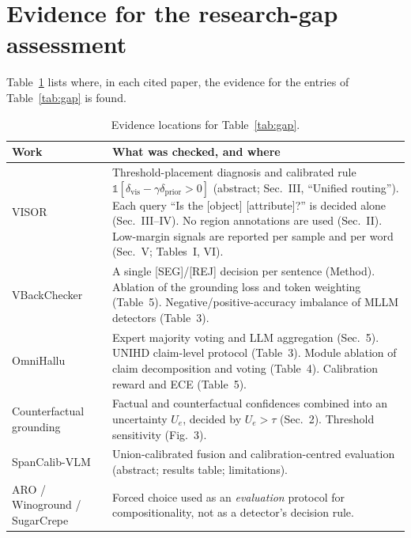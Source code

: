 \documentclass[11pt]{article}
\begin{document}
\appendix
\section{Evidence for the research-gap assessment}\label{app:evidence}
Table~\ref{tab:evidence} lists where, in each cited paper, the evidence for the entries of Table~\ref{tab:gap} is found.

\begin{table}[!htbp]
\centering
\caption{Evidence locations for Table~\ref{tab:gap}.}
\label{tab:evidence}
\footnotesize
\begin{tabularx}{\textwidth}{@{}l>{\raggedright\arraybackslash}X@{}}
\toprule
Work & What was checked, and where \\
\midrule
VISOR~\cite{zhang2026visor} & Threshold-placement diagnosis and calibrated rule $\mathbb{1}[\delta_{\mathrm{vis}}-\gamma\delta_{\mathrm{prior}}>0]$ (abstract; Sec.~III, ``Unified routing''). Each query ``Is the [object] [attribute]?'' is decided alone (Sec.~III--IV). No region annotations are used (Sec.~II). Low-margin signals are reported per sample and per word (Sec.~V; Tables~I, VI). \\
VBackChecker~\cite{guo2026vbackchecker} & A single [SEG]/[REJ] decision per sentence (Method). Ablation of the grounding loss and token weighting (Table~5). Negative/positive-accuracy imbalance of MLLM detectors (Table~3). \\
OmniHallu~\cite{yang2026omnihallu} & Expert majority voting and LLM aggregation (Sec.~5). UNIHD claim-level protocol (Table~3). Module ablation of claim decomposition and voting (Table~4). Calibration reward and ECE (Table~5). \\
Counterfactual grounding~\cite{song2026countervhd} & Factual and counterfactual confidences combined into an uncertainty $U_e$, decided by $U_e>\tau$ (Sec.~2). Threshold sensitivity (Fig.~3). \\
SpanCalib-VLM~\cite{abebe2026spancalib} & Union-calibrated fusion and calibration-centred evaluation (abstract; results table; limitations). \\
ARO / Winoground / SugarCrepe~\cite{yuksekgonul2023bow,thrush2022winoground,hsieh2023sugarcrepe} & Forced choice used as an \emph{evaluation} protocol for compositionality, not as a detector's decision rule. \\
\bottomrule
\end{tabularx}
\end{table}
\end{document}
